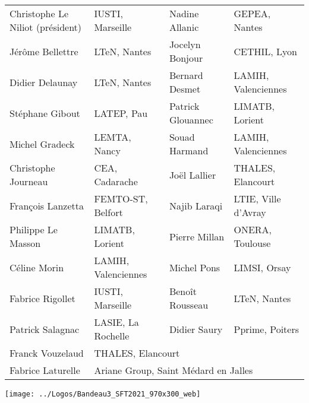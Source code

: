 \noindent
\begin{tabular}{llll}
Christophe Le Niliot (président) 	& IUSTI, Marseille 	& Nadine Allanic    & GEPEA, Nantes\\
Jérôme  Bellettre					& LTeN, Nantes		& Jocelyn Bonjour	& CETHIL, Lyon\\
Didier Delaunay 					& LTeN, Nantes		& Bernard Desmet 	& LAMIH, Valenciennes\\
Stéphane Gibout 					& LATEP, Pau 		& Patrick Glouannec & LIMATB, Lorient\\
Michel Gradeck 						& LEMTA, Nancy		& Souad Harmand 	& LAMIH, Valenciennes\\
Christophe Journeau 				& CEA, Cadarache	& Joël Lallier 		& THALES, Elancourt \\
François Lanzetta					& FEMTO-ST, Belfort & Najib Laraqi 		& LTIE, Ville d’Avray\\
Philippe Le Masson 					& LIMATB, Lorient	& Pierre Millan  	& ONERA, Toulouse\\
Céline Morin				 		& LAMIH, Valenciennes & Michel Pons	 	& LIMSI, Orsay\\
Fabrice Rigollet					& IUSTI, Marseille  & Benoît Rousseau	& LTeN, Nantes\\
Patrick Salagnac					& LASIE, La Rochelle& Didier Saury		& Pprime, Poiters\\
Franck Vouzelaud 					& \multicolumn{3}{l}{THALES, Elancourt}\\
Fabrice Laturelle  					& \multicolumn{3}{l}{Ariane Group, Saint Médard en Jalles}  \\

\end{tabular}




\clearpage


\noindent
\begin{center}
\texttt{[image: ../Logos/Bandeau3\_SFT2021\_970x300\_web]}%
\end{center}



